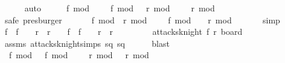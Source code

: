 \begin{isabellebody}
\ \ \ \ \isamarkupfalse%
\ auto\isanewline
\isanewline
\ \ \isamarkupfalse%
\ \isamarkupfalse%
\ {\isachardoublequoteopen}f{}\ mod\ {}\ {\isasymnoteq}\ {}\ {\isacharminus}\ f{}\ mod\ {}\ {\isasymor}\ r{}\ mod\ {}\ {\isasymnoteq}\ {}\ {\isacharminus}\ r{}\ mod\ {}{\isachardoublequoteclose}\isanewline
\ \ \ \ \isamarkupfalse%
\ {\isacharasterisk}{\isacharasterisk}{\isacharparenleft}{}{\isacharminus}{}{\isacharparenright}\isanewline
\ \ \ \ \isamarkupfalse%
\ safe\ presburger{\isacharplus}\isanewline
\isanewline
\ \ \isamarkupfalse%
\ \isamarkupfalse%
\ {}{\isacharcolon}\ {\isachardoublequoteopen}{\isacharparenleft}f{}\ mod\ {}{\isacharcomma}\ r{}\ mod\ {}{\isacharparenright}\ {\isasymnoteq}\ {\isacharparenleft}{}\ {\isacharminus}\ f{}\ mod\ {}{\isacharcomma}\ {}\ {\isacharminus}\ r{}\ mod\ {}{\isacharparenright}{\isachardoublequoteclose}\isanewline
\ \ \ \ \isamarkupfalse%
\ simp\isanewline
\isanewline
\ \ \isamarkupfalse%
\ {\isachardoublequoteopen}{\isacharparenleft}{\isasymbar}f{}\ {\isacharminus}\ f{}{\isasymbar}\ {\isacharequal}\ {}\ {\isasymlongrightarrow}\ {\isasymbar}r{}\ {\isacharminus}\ r{}{\isasymbar}\ {\isasymnoteq}\ {}{\isacharparenright}\ {\isasymand}\ {\isacharparenleft}{\isasymbar}f{}\ {\isacharminus}\ f{}{\isasymbar}\ {\isacharequal}\ {}\ {\isasymlongrightarrow}\ {\isasymbar}r{}\ {\isacharminus}\ r{}{\isasymbar}\ {\isasymnoteq}\ {}{\isacharparenright}{\isachardoublequoteclose}\isanewline
\ \ \ \ \isamarkupfalse%
\ {\isacharbackquoteopen}{\isasymnot}\ attacks{\isacharunderscore}knight\ {\isacharparenleft}f{}{\isacharcomma}\ r{}{\isacharparenright}\ board{\isacharbackquoteclose}\isanewline
\ \ \ \ \isamarkupfalse%
\ assms\ attacks{\isacharunderscore}knight{\isachardot}simps\ sq{}\ sq{}\isanewline
\ \ \ \ \isamarkupfalse%
\ blast\isanewline
\isanewline
\ \ \isamarkupfalse%
\ \isamarkupfalse%
\ {}{\isacharcolon}\ {\isachardoublequoteopen}{\isasymbar}f{}\ mod\ {}\ {\isacharminus}\ f{}\ mod\ {}{\isasymbar}\ {\isasymnoteq}\ {}\ {\isasymor}\ {\isasymbar}r{}\ mod\ {}\ {\isacharminus}\ r{}\ mod\ {}{\isasymbar}\ {\isasymnoteq}\ {}{\isachardoublequoteclose}\isanewline

\end{isabellebody}
